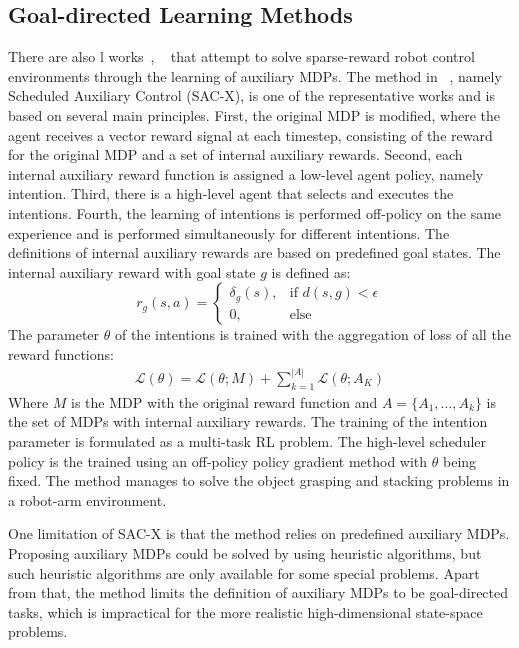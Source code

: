 \subsection{Goal-directed Learning Methods}
There are also l works~\cite{riedmiller2018learning}, ~\cite{andrychowicz2017hindsight} that attempt to solve sparse-reward robot control environments through the learning of auxiliary MDPs.
The method in ~\cite{riedmiller2018learning}, namely Scheduled Auxiliary Control (SAC-X), is one of the representative works and is based on several main principles. First, the original MDP is modified, where the agent receives a vector reward signal at each timestep, consisting of the reward for the original MDP and a set of internal auxiliary rewards. Second, each internal auxiliary reward function is assigned a low-level agent policy, namely intention. Third, there is a high-level agent that selects and executes the intentions. Fourth, the learning of intentions is performed off-policy on the same experience and is performed simultaneously for different intentions.
The definitions of internal auxiliary rewards are based on predefined goal states. The internal auxiliary reward with goal state $g$ is defined as:
\begin{equation}
r_g(s,a)=
\begin{cases}
\delta_g(s),& \text{if } d(s,g)< \epsilon\\
0,              & \text{else}
\end{cases}
\end{equation}
The parameter $\theta$ of the intentions is trained with the aggregation of loss of all the reward functions:
\begin{align}
\mathcal{L}(\theta)  = \mathcal{L}(\theta;M) +\sum_{k=1}^{|A|} \mathcal{L}(\theta;A_K)
\end{align}
Where $M$ is the MDP with the original reward function and $A=\{A_1,\dots,A_k\}$ is the set of MDPs with internal auxiliary rewards. The training of the intention parameter is formulated as a multi-task RL problem.
The high-level scheduler policy is the trained using an off-policy policy gradient method with $\theta$ being fixed.
The method manages to solve the object grasping and stacking problems in a robot-arm environment. 

One limitation of SAC-X is that the method relies on predefined auxiliary MDPs. Proposing auxiliary MDPs could be solved by using heuristic algorithms, but such heuristic algorithms are only available for some special problems. Apart from that, the method limits the definition of auxiliary MDPs to be goal-directed tasks, which is impractical for the more realistic high-dimensional state-space problems.


